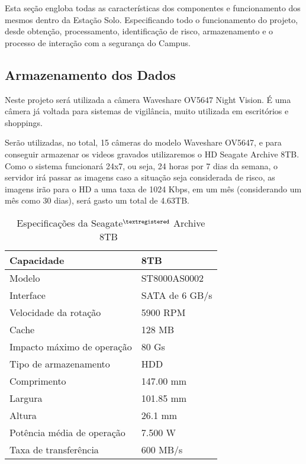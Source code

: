 Esta seção engloba todas as características dos componentes e funcionamento dos mesmos dentro da Estação Solo. Especificando todo o funcionamento do projeto, desde obtenção, processamento, identificação de risco, armazenamento e o processo de interação com a segurança do Campus.

\subsection{Armazenamento dos Dados}

	Neste projeto será utilizada a câmera Waveshare OV5647 Night Vision. É uma câmera já voltada para sistemas de vigilância, muito utilizada em escritórios e shoppings.

	Serão utilizadas, no total, 15 câmeras do modelo  Waveshare OV5647, e para conseguir armazenar os videos gravados utilizaremos o HD Seagate Archive 8TB. Como o sistema funcionará  24x7, ou seja, 24 horas por 7 dias da semana, o servidor irá passar as imagens caso a situação seja considerada de risco, as imagens irão para o HD a uma taxa de 1024 Kbps, em um mês (considerando um mês como 30 dias), será gasto um total de 4.63TB.

\begin{table}[H]
	\centering
	\caption[Especificações da Seagate Archive 8TB]{Especificações da Seagate$^{\textregistered}$ Archive 8TB~\cite{seagate}}
	\begin{tabular}{|l|l|}
		\hline
		Capacidade                  & 8TB            \\ \hline
		Modelo                      & ST8000AS0002    \\ \hline
		Interface                   & SATA de 6 GB/s \\ \hline
		Velocidade da rotação       & 5900 RPM       \\ \hline
		Cache                       & 128 MB          \\ \hline
		Impacto máximo de operação  & 80 Gs          \\ \hline
		Tipo de armazenamento       & HDD            \\ \hline
		Comprimento                 & 147.00 mm      \\ \hline
		Largura                     & 101.85 mm      \\ \hline
		Altura                      & 26.1 mm        \\ \hline
		Potência média de operação  & 7.500 W        \\ \hline
		Taxa de transferência       & 600 MB/s       \\ \hline
	\end{tabular}
	\label{tab:my-label}
\end{table}

